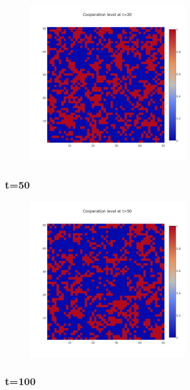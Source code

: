 \documentclass[11pt]{article}
\begin{document}
\begin{figure}[H]
\centering
   \includegraphics[width=0.6\textwidth]{img/part2/part2-moore-visu-20.png}
\end{figure}

\subsubsection{t=50}

\begin{figure}[H]
\centering
   \includegraphics[width=0.6\textwidth]{img/part2/part2-moore-visu-50.png}
\end{figure}

\subsubsection{t=100}
\end{document}
